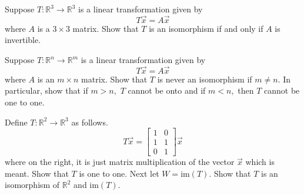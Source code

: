 \documentclass{ximera}
\begin{document}
\begin{problem}\label{prb:10.81} Suppose $T:\mathbb{R}^{3}\rightarrow \mathbb{R}^{3}$ is a linear
transformation given by
\begin{equation*}
T\vec{x}=A\vec{x}
\end{equation*}
where $A$ is a $3\times 3$ matrix. Show that $T$ is an isomorphism if and
only if $A$ is invertible.
\end{problem}


\begin{problem}\label{prb:10.82} Suppose $T:\mathbb{R}^{n}\rightarrow \mathbb{R}^{m}$ is a linear
transformation given by
\begin{equation*}
T\vec{x}=A\vec{x}
\end{equation*}
where $A$ is an $m\times n$ matrix. Show that $T$ is never an isomorphism if
$m\neq n$. In particular, show that if $m>n,$ $T$ cannot be onto and if $
m<n, $ then $T$ cannot be one to one.
\end{problem}


\begin{problem}\label{prb:10.83} Define $T:\mathbb{R}^{2}\rightarrow \mathbb{R}^{3}$ as follows.
\begin{equation*}
T\vec{x}=\left[
\begin{array}{cc}
1 & 0 \\
1 & 1 \\
0 & 1
\end{array}
\right] \vec{x}
\end{equation*}
where on the right, it is just matrix multiplication of the vector $\vec{x}$
which is meant. Show that $T$ is one to one. Next let $W=\mbox{im}\left(
T\right) .$ Show that $T$ is an isomorphism of $\mathbb{R}^{2}$ and $\mbox{im
}\left( T\right) $.
\end{problem}
\end{document}
